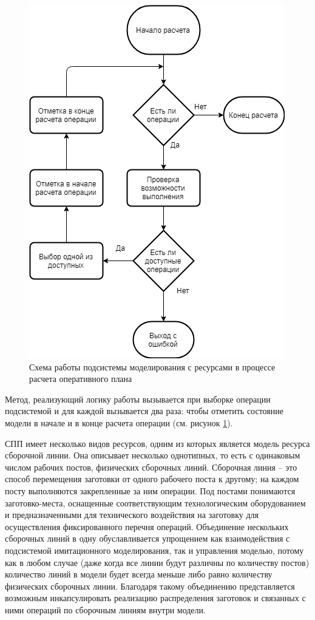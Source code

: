 \begin{figure}[h]
	\centering
	\includegraphics[scale=0.6]{pics/assemblyResSchema.png}
	\caption{Схема работы подсистемы моделирования с ресурсами в процессе расчета оперативного плана}
	\label{fig:assemblyResSchema}
\end{figure}

\indent Метод, реализующий логику работы вызывается при выборке операции подсистемой и для каждой вызывается два раза: чтобы отметить состояние модели в начале и в конце расчета операции (см. рисунок \ref{fig:assemblyResSchema}).

\indent СПП имеет несколько видов ресурсов, одним из которых является модель ресурса сборочной линии.
Она описывает несколько однотипных, то есть с одинаковым числом рабочих постов, физических сборочных линий.
Сборочная линия -- это способ перемещения заготовки от одного рабочего поста к другому; на каждом посту выполняются закрепленные за ним операции.
Под постами понимаются заготовко-места, оснащенные соответствующим технологическим оборудованием и предназначенными для технического воздействия на заготовку для осуществления фиксированного перечня операций.
Объединение нескольких сборочных линий в одну обуславливается упрощением как взаимодействия с подсистемой имитационного моделирования, так и управления моделью, потому как в любом случае (даже когда все линии будут различны по количеству постов) количество линий в модели будет всегда меньше либо равно количеству физических сборочных линии.
Благодаря такому объединению представляется возможным инкапсулировать реализацию распределения заготовок и связанных с ними операций по сборочным линиям внутри модели.


